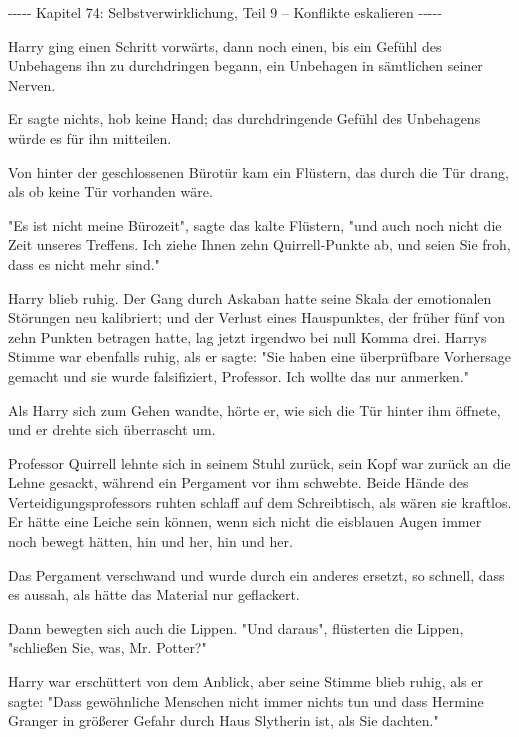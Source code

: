 

\hypertarget{selbstverwirklichung-teil-9-konflikte-eskalieren}{%

-\/-\/-\/-\/- Kapitel 74: Selbstverwirklichung, Teil 9 -- Konflikte eskalieren -\/-\/-\/-\/-

Harry ging einen Schritt vorwärts, dann noch einen, bis ein Gefühl des Unbehagens ihn zu durchdringen begann, ein Unbehagen in sämtlichen seiner Nerven.

Er sagte nichts, hob keine Hand; das durchdringende Gefühl des Unbehagens würde es für ihn mitteilen.

Von hinter der geschlossenen Bürotür kam ein Flüstern, das durch die Tür drang, als ob keine Tür vorhanden wäre.

"Es ist nicht meine Bürozeit", sagte das kalte Flüstern, "und auch noch nicht die Zeit unseres Treffens. Ich ziehe Ihnen zehn Quirrell-Punkte ab, und seien Sie froh, dass es nicht mehr sind."

Harry blieb ruhig. Der Gang durch Askaban hatte seine Skala der emotionalen Störungen neu kalibriert; und der Verlust eines Hauspunktes, der früher fünf von zehn Punkten betragen hatte, lag jetzt irgendwo bei null Komma drei. Harrys Stimme war ebenfalls ruhig, als er sagte: "Sie haben eine überprüfbare Vorhersage gemacht und sie wurde falsifiziert, Professor. Ich wollte das nur anmerken."

Als Harry sich zum Gehen wandte, hörte er, wie sich die Tür hinter ihm öffnete, und er drehte sich überrascht um.

Professor Quirrell lehnte sich in seinem Stuhl zurück, sein Kopf war zurück an die Lehne gesackt, während ein Pergament vor ihm schwebte. Beide Hände des Verteidigungsprofessors ruhten schlaff auf dem Schreibtisch, als wären sie kraftlos. Er hätte eine Leiche sein können, wenn sich nicht die eisblauen Augen immer noch bewegt hätten, hin und her, hin und her.

Das Pergament verschwand und wurde durch ein anderes ersetzt, so schnell, dass es aussah, als hätte das Material nur geflackert.

Dann bewegten sich auch die Lippen. "Und daraus", flüsterten die Lippen, "schließen Sie, was, Mr. Potter?"

Harry war erschüttert von dem Anblick, aber seine Stimme blieb ruhig, als er sagte: "Dass gewöhnliche Menschen nicht immer nichts tun und dass Hermine Granger in größerer Gefahr durch Haus Slytherin ist, als Sie dachten."

}
